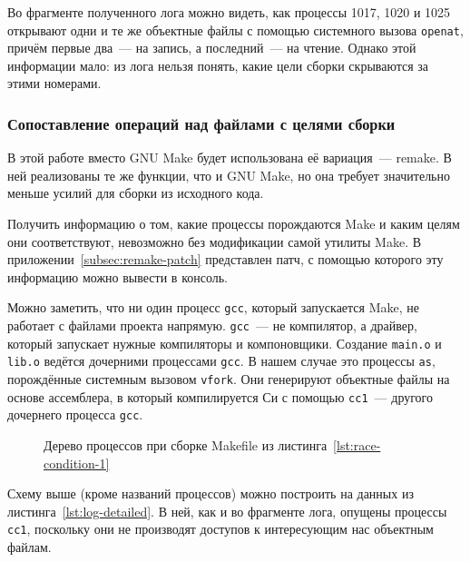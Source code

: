 Во фрагменте полученного лога можно видеть, как процессы 1017, 1020 и 1025 открывают одни и те же объектные файлы с помощью системного вызова \texttt{openat}, причём первые два~--- на запись, а последний~--- на чтение. Однако этой информации мало: из лога нельзя понять, какие цели сборки скрываются за этими номерами.

\subsubsection{Сопоставление операций над файлами с целями сборки}
\label{subsubsec:link-ops-with-targets}

В этой работе вместо GNU Make будет использована её вариация~--- remake. В ней реализованы те же функции, что и GNU Make, но она требует значительно меньше усилий для сборки из исходного кода.

Получить информацию о том, какие процессы порождаются Make и каким целям они соответствуют, невозможно без модификации самой утилиты Make. В приложении~\ref{subsec:remake-patch} представлен патч, с помощью которого эту информацию можно вывести в консоль.

\begin{figure}[H]

\end{figure}

Можно заметить, что ни один процесс \texttt{gcc}, который запускается Make, не работает с файлами проекта напрямую. \texttt{gcc}~--- не компилятор, а драйвер, который запускает нужные компиляторы и компоновщики. Создание \texttt{main.o} и \texttt{lib.o} ведётся дочерними процессами \texttt{gcc}. В нашем случае это процессы \texttt{as}, порождённые системным вызовом \texttt{vfork}. Они генерируют объектные файлы на основе ассемблера, в который компилируется Си с помощью \texttt{cc1}~--- другого дочернего процесса \texttt{gcc}.

\begin{figure}[H]
	\centering
    
    \caption{Дерево процессов при сборке Makefile из листинга~\ref{lst:race-condition-1}}
    \label{fig:pstree1}
\end{figure}

Схему выше (кроме названий процессов) можно построить на данных из листинга~\ref{lst:log-detailed}. В ней, как и во фрагменте лога, опущены процессы \texttt{cc1}, поскольку они не производят доступов к интересующим нас объектным файлам.

